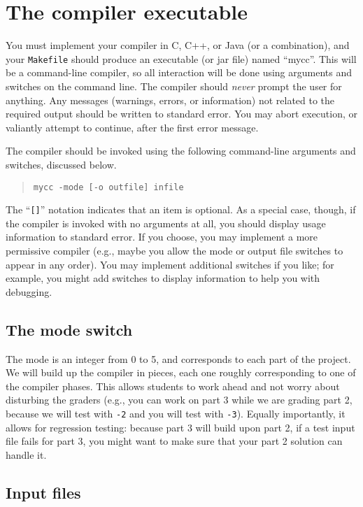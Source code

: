 \documentclass{article}
\newcommand{\compiler}{mycc}
\begin{document}
\section{The compiler executable}

You must implement your compiler in C, C++, or Java (or a combination),
and your {\tt Makefile} should produce an executable (or jar file)
named ``\compiler''.
This will be a command-line compiler, so all interaction will be done
using arguments and switches on the command line.
The compiler should \emph{never} prompt the user for anything.
Any messages (warnings, errors, or information)
not related to the required output
should be written to standard error.
You may abort execution, or valiantly attempt to continue,
after the first error message.

The compiler should be invoked using the following
command-line arguments and switches, discussed below.
\begin{quote}
\tt \compiler{} -mode [-o outfile] infile
\end{quote}
The ``{\tt []}'' notation indicates that an item is optional.
As a special case, though,
if the compiler is invoked with no arguments at all,
  you should display usage information to standard error.
If you choose, you may implement a more permissive compiler
(e.g., maybe you allow the mode or output file switches
to appear in any order).
You may implement additional switches if you like;
for example,
  you might add switches to display information
  to help you with debugging.

\subsection{The mode switch}

The mode is an integer from 0 to 5,
and corresponds to each part of the project.
We will build up the compiler in pieces,
each one roughly corresponding to one of the compiler phases.
This allows students to work ahead and not worry about disturbing the graders
(e.g., you can work on part 3 while we are grading part 2,
because we will test with {\tt -2} and you will test with {\tt -3}).
Equally importantly,
it allows for regression testing:
because part 3 will build upon part 2,
if a test input file fails for part 3,
  you might want to make sure that your part 2 solution can handle it.

\subsection{Input files}
\end{document}
